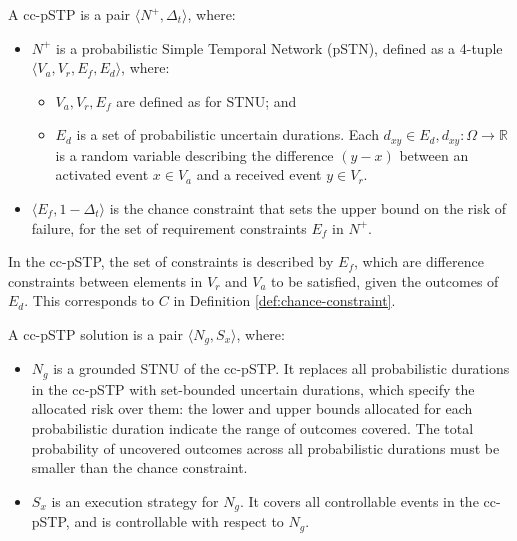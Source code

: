 \documentclass[jair,twoside,11pt,theapa]{article}
\begin{document}
\begin{mydef}
	
	A cc-pSTP is a pair $\langle N^+,\Delta_t\rangle$, where:
	
	\begin{itemize}
		
		\item $N^+$ is a probabilistic Simple Temporal Network (pSTN), defined as a
		4-tuple $\langle V_a,V_r,E_f,E_d\rangle$, where:
		
		\begin{itemize}
			
			\item $V_a,V_r,E_f$ are defined as for STNU; and 
			
			\item $E_d$ is a set of probabilistic uncertain durations. Each $d_{xy}\in
			E_d, d_{xy}:\Omega\rightarrow\mathbb{R}$ is a random variable describing the difference $(y-x)$ between an activated 
			event $x\in V_a$ and a received event $y\in V_r$. 
			
		\end{itemize}
		
		\item $\langle E_f, 1 - \Delta_t\rangle$ is the chance constraint that sets the upper bound
		on the risk of failure, for the set of requirement constraints $E_f$ in $N^+$.
		
	\end{itemize}
	
	
\end{mydef}

In the cc-pSTP, the set of constraints is described by $E_f$, which are
difference constraints between elements in $V_r$ and $V_a$ to be satisfied,
given the outcomes of $E_d$. This corresponds to $C$ in Definition
\ref{def:chance-constraint}.

\begin{mydef}
	
	A cc-pSTP solution is a pair $\langle N_g,S_{x}\rangle$, where:
	
	\begin{itemize}
		
		\item $N_g$ is a grounded STNU of the cc-pSTP. It replaces all probabilistic
		durations in the cc-pSTP with set-bounded uncertain durations, which specify
		the allocated risk over them: the lower and upper bounds allocated for each
		probabilistic duration indicate the range of outcomes covered. The total
		probability of uncovered outcomes across all probabilistic durations must be
		smaller than the chance constraint.
		
		\item $S_x$ is an execution strategy for $N_g$. It covers all controllable
		events in the cc-pSTP, and is controllable with respect to $N_g$. 
		
	\end{itemize}
	
\end{mydef}
\end{document}
